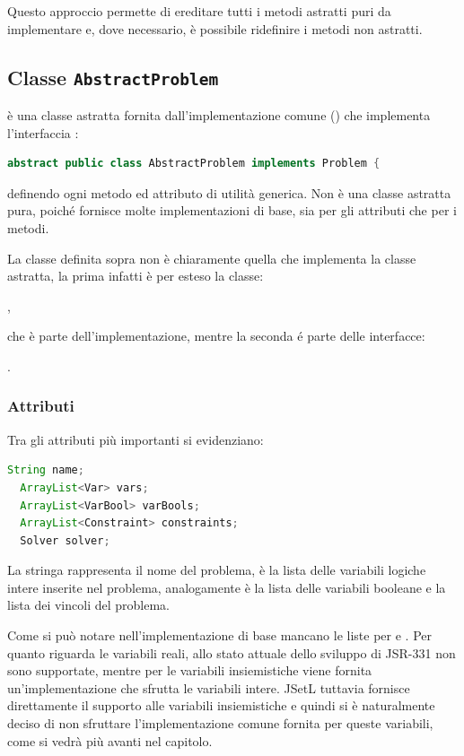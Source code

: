 Questo approccio permette di ereditare tutti i metodi astratti puri da 
implementare e, dove necessario, è possibile ridefinire i metodi non astratti.

\subsection{Classe \texttt{AbstractProblem}}
 è una classe astratta fornita dall'implementazione 
comune () che implementa l'interfaccia
:
\begin{lstlisting}[language = Java, frame = single]
abstract public class AbstractProblem implements Problem {
\end{lstlisting}
definendo ogni metodo ed attributo di utilità generica. Non è una classe
astratta pura, poiché fornisce molte implementazioni di base, sia per gli 
attributi che per i metodi.

\begin{nota}
La classe  definita sopra non è chiaramente quella che implementa
la classe astratta, la prima infatti è per esteso la classe:
\begin{center} 
,
\end{center} 
che è parte dell'implementazione, mentre la seconda é parte delle interfacce:
\begin{center}
.
\end{center}
\end{nota}

\subsubsection{Attributi}
Tra gli attributi più importanti si evidenziano:
\begin{lstlisting}[language = Java, frame = single]
  String name;
  ArrayList<Var> vars;
  ArrayList<VarBool> varBools;
  ArrayList<Constraint> constraints;
  Solver solver;
\end{lstlisting}
La stringa  rappresenta il nome del problema,  è
la lista delle variabili logiche intere inserite nel problema, analogamente
 è la lista delle variabili booleane e  la
lista dei vincoli del problema.

Come si può notare nell'implementazione di base mancano le liste per 
 e . Per quanto riguarda le variabili reali, allo
stato attuale dello sviluppo di JSR-331 non sono supportate, mentre per le 
variabili 
insiemistiche viene fornita un'implementazione che sfrutta le variabili intere.
JSetL tuttavia fornisce direttamente il supporto alle variabili insiemistiche 
e quindi si è naturalmente deciso di non sfruttare l'implementazione comune 
fornita per queste variabili, come si vedrà più avanti nel capitolo.


